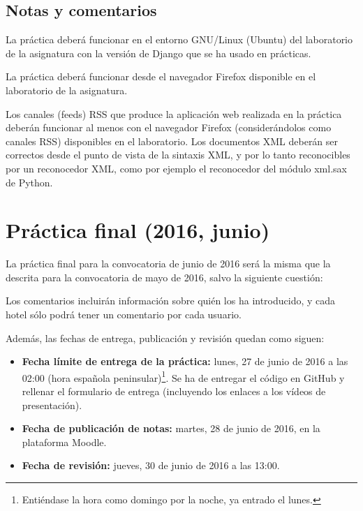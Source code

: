 \subsection{Notas y comentarios}

La práctica deberá funcionar en el entorno GNU/Linux (Ubuntu) del laboratorio de la asignatura con la versión de Django que se ha usado en prácticas.

La práctica deberá funcionar desde el navegador Firefox disponible en el laboratorio de la asignatura.

Los canales (feeds) RSS que produce la aplicación web realizada en la práctica deberán funcionar al menos con el navegador Firefox (considerándolos como canales RSS) disponibles en el laboratorio. Los documentos XML deberán ser correctos desde el punto de vista de la sintaxis XML, y por lo tanto reconocibles por un reconocedor XML, como por ejemplo el reconocedor del módulo xml.sax de Python.


\section{Práctica final (2016, junio)}
\label{practica-final-2016-06}

La práctica final para la convocatoria de junio de 2016 será la misma que la descrita para la convocatoria de mayo de 2016, salvo la siguiente cuestión:
 
Los comentarios incluirán información sobre quién los ha introducido, y cada hotel sólo podrá tener un comentario por cada usuario.

Además, las fechas de entrega, publicación y revisión quedan como siguen:

\begin{itemize}
  \item \textbf{Fecha límite de entrega de la práctica:} lunes, 27 de junio de 2016 a las 02:00 (hora española peninsular)\footnote{Entiéndase la hora como domingo por la noche, ya entrado el lunes.}. Se ha de entregar el código en GitHub y rellenar el formulario de entrega (incluyendo los enlaces a los vídeos de presentación).

  \item \textbf{Fecha de publicación de notas:} martes, 28 de junio de 2016, en la plataforma Moodle.

  \item \textbf{Fecha de revisión:} jueves, 30 de junio de 2016 a las 13:00.
\end{itemize}




